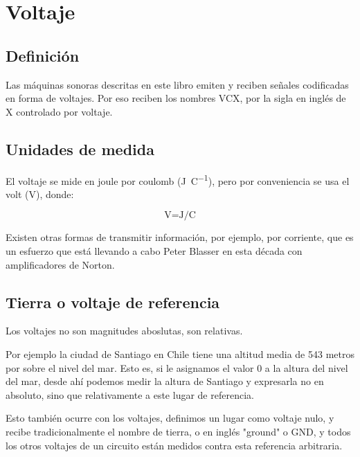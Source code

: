 \documentclass[../principal.tex]{subfiles}
\begin{document}
\chapter{Voltaje}

\section{Definición}

Las máquinas sonoras descritas en este libro emiten y reciben señales codificadas en forma de voltajes. Por eso reciben los nombres VCX, por la sigla en inglés de X controlado por voltaje.

\section{Unidades de medida}

El voltaje se mide en joule por coulomb (\unit{\joule\per\coulomb}), pero por conveniencia se usa el volt (\unit{\volt}), donde:

\begin{equation}
    \unit{\volt} = \unit{\joule\per\coulomb}
\end{equation}


Existen otras formas de transmitir información, por ejemplo, por corriente, que es un esfuerzo que está llevando a cabo Peter Blasser en esta década con amplificadores de Norton.

\section{Tierra o voltaje de referencia}

Los voltajes no son magnitudes aboslutas, son relativas.

Por ejemplo la ciudad de Santiago en Chile tiene una altitud media de 543 metros por sobre el nivel del mar. Esto es, si le asignamos el valor 0 a la altura del nivel del mar, desde ahí podemos medir la altura de Santiago y expresarla no en absoluto, sino que relativamente a este lugar de referencia.

Esto también ocurre con los voltajes, definimos un lugar como voltaje nulo, y recibe tradicionalmente el nombre de tierra, o en inglés "ground" o GND, y todos los otros voltajes de un circuito están medidos contra esta referencia arbitraria.
\end{document}
